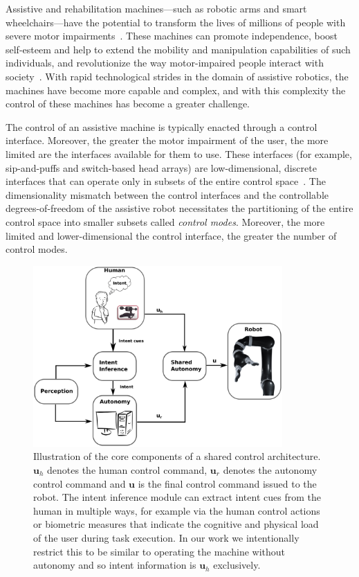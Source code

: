 Assistive and rehabilitation machines---such as robotic arms and smart wheelchairs---have the potential to transform the lives of millions of people with severe motor impairments~\citep{laplante1992assistive}. These machines can promote independence, boost self-esteem and help to extend the mobility and manipulation capabilities of such individuals, and revolutionize the way motor-impaired people interact with society~\citep{scherer1996outcomes, huete2012personal}. With rapid technological strides in the domain of assistive robotics, the machines have become more capable and complex, and with this complexity the control of these machines has become a greater challenge. 

The control of an assistive machine is typically enacted through a control interface. Moreover, the greater the motor impairment of the user, the more limited are the interfaces available for them to use. These interfaces (for example, sip-and-puffs and switch-based head arrays) are low-dimensional, discrete interfaces that can operate only in subsets of the entire control space~\citep{simpson2008tooth, nuttin2002selection}. 
The dimensionality mismatch between the control interfaces and the controllable degrees-of-freedom of the assistive robot necessitates the partitioning of the entire control space into smaller subsets called \textit{control modes}. Moreover, the more limited and lower-dimensional the control interface, the greater the number of control modes. 
\begin{figure}[t!]
	\includegraphics[keepaspectratio, width = 0.85\textwidth, center]{./finalfigures/Fig1.eps}
	\caption{Illustration of the core components of a shared control architecture. $\boldsymbol{u}_h$ denotes the human control command, $\boldsymbol{u}_r$ denotes the autonomy control command and $\boldsymbol{u}$ is the final control command issued to the robot. The intent inference module can extract intent cues from the human in multiple ways, for example via the human control actions or biometric measures that indicate the cognitive and physical load of the user during task execution. In our work we intentionally restrict this to be similar to operating the machine without autonomy and so intent information is $\boldsymbol{u}_h$ exclusively. }
	\label{fig:shared_control}
\end{figure}
